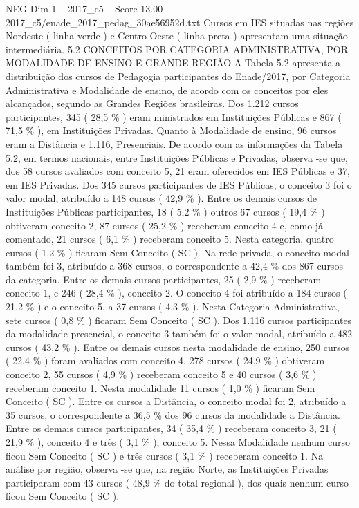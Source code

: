\begin{textsample}{NEG Dim 1 – 2017\_c5 – Score 13.00 – 2017\_c5/enade\_2017\_pedag\_30ae56952d.txt}
Cursos em IES situadas nas regiões Nordeste ( linha verde ) e Centro-Oeste ( linha preta ) apresentam uma situação intermediária. 5.2 CONCEITOS POR CATEGORIA ADMINISTRATIVA, POR MODALIDADE DE ENSINO E GRANDE REGIÃO A Tabela 5.2 apresenta a distribuição dos cursos de Pedagogia participantes do Enade/2017, por Categoria Administrativa e Modalidade de ensino, de acordo com os conceitos por eles alcançados, segundo as Grandes Regiões brasileiras.
Dos 1.212 cursos participantes, 345 ( 28,5 \% ) eram ministrados em Instituições Públicas e 867 ( 71,5 \% ), em Instituições Privadas.
Quanto à Modalidade de ensino, 96 cursos eram a Distância e 1.116, Presenciais.
De acordo com as informações da Tabela 5.2, em termos nacionais, entre Instituições Públicas e Privadas, observa -se que, dos 58 cursos avaliados com conceito 5, 21 eram oferecidos em IES Públicas e 37, em IES Privadas.
Dos 345 cursos participantes de IES Públicas, o conceito 3 foi o valor modal, atribuído a 148 cursos ( 42,9 \% ).
Entre os demais cursos de Instituições Públicas participantes, 18 ( 5,2 \% ) outros 67 cursos ( 19,4 \% ) obtiveram conceito 2, 87 cursos ( 25,2 \% ) receberam conceito 4 e, como já comentado, 21 cursos ( 6,1 \% ) receberam conceito 5.
Nesta categoria, quatro cursos ( 1,2 \% ) ficaram Sem Conceito ( SC ).
Na rede privada, o conceito modal também foi 3, atribuído a 368 cursos, o correspondente a 42,4 \% dos 867 cursos da categoria.
Entre os demais cursos participantes, 25 ( 2,9 \% ) receberam conceito 1, e 246 ( 28,4 \% ), conceito 2.
O conceito 4 foi atribuído a 184 cursos ( 21,2 \% ) e o conceito 5, a 37 cursos ( 4,3 \% ).
Nesta Categoria Administrativa, sete cursos ( 0,8 \% ) ficaram Sem Conceito ( SC ).
Dos 1.116 cursos participantes da modalidade presencial, o conceito 3 também foi o valor modal, atribuído a 482 cursos ( 43,2 \% ).
Entre os demais cursos nesta modalidade de ensino, 250 cursos ( 22,4 \% ) foram avaliados com conceito 4, 278 cursos ( 24,9 \% ) obtiveram conceito 2, 55 cursos ( 4,9 \% ) receberam conceito 5 e 40 cursos ( 3,6 \% ) receberam conceito 1.
Nesta modalidade 11 cursos ( 1,0 \% ) ficaram Sem Conceito ( SC ).
Entre os cursos a Distância, o conceito modal foi 2, atribuído a 35 cursos, o correspondente a 36,5 \% dos 96 cursos da modalidade a Distância.
Entre os demais cursos participantes, 34 ( 35,4 \% ) receberam conceito 3, 21 ( 21,9 \% ), conceito 4 e três ( 3,1 \% ), conceito 5.
Nessa Modalidade nenhum curso ficou Sem Conceito ( SC ) e três cursos ( 3,1 \% ) receberam conceito 1.
Na análise por região, observa -se que, na região Norte, as Instituições Privadas participaram com 43 cursos ( 48,9 \% do total regional ), dos quais nenhum curso ficou Sem Conceito ( SC ).

\end{textsample}
